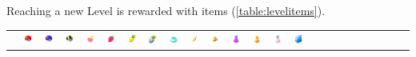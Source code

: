 Reaching a new Level is rewarded with items (\autoref{table:levelitems}).
\begin{table}[t]
  \begin{center}
  \setlength{\tabcolsep}{1pt}
  \footnotesize
  \begin{tabular}{r|g c g c g c g c g c g c g c g c g c g c g c g}
  &
  \includegraphics[width=1em]{images/pokeball.png} &
  \includegraphics[width=1em]{images/greatball.png} &
  \includegraphics[width=1em]{images/ultraball.png} &
  \includegraphics[width=1em]{images/nanab.png} &
  \includegraphics[width=1em]{images/razz.png} &
  \includegraphics[width=1em]{images/pinap.png} &
  \includegraphics[width=1em]{images/silverpinap.png} &
  \includegraphics[width=1em]{images/incense.png} &
  \includegraphics[width=1em]{images/revive.png} &
  \includegraphics[width=1em]{images/maxrevive.png} &
  \includegraphics[width=1em]{images/Potion.png} &
  \includegraphics[width=1em]{images/superpotion.png} &
  \includegraphics[width=1em]{images/Hyper_Potion.png} &
  \includegraphics[width=1em]{images/Max_Potion.png} &

\end{tabular}
\end{center}
\end{table}
